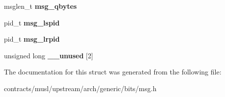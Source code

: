 \begin{DoxyCompactItemize}
\item 
\mbox{\label{structmsqid__ds_ac9a5e4f95ae0c3badffdb956a9b5169e}} 
msglen\+\_\+t {\bfseries msg\+\_\+qbytes}
\item 
\mbox{\label{structmsqid__ds_aad3614ccc8999a9b1c518f776ae27e8f}} 
pid\+\_\+t {\bfseries msg\+\_\+lspid}
\item 
\mbox{\label{structmsqid__ds_acc7d02e6a3d2bc74e57fa84502fa64ae}} 
pid\+\_\+t {\bfseries msg\+\_\+lrpid}
\item 
\mbox{\label{structmsqid__ds_aceef9a4d964b99c48419d0ec881ba7ba}} 
unsigned long {\bfseries \+\_\+\+\_\+unused} \mbox{[}2\mbox{]}
\end{DoxyCompactItemize}


The documentation for this struct was generated from the following file\+:\begin{DoxyCompactItemize}
\item 
contracts/musl/upstream/arch/generic/bits/msg.\+h\end{DoxyCompactItemize}

